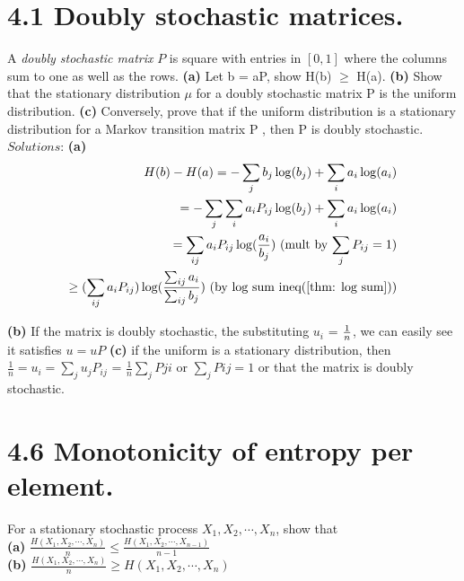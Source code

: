 \documentclass[10pt]{article}
\newcommand{\pref}[1]{{(\ref{#1})}}
\begin{document}
\begin{tiny}
\begin{multicols}{3}
\section*{4.1 Doubly stochastic matrices.} %
A \emph{doubly stochastic matrix} $P$ is square with entries in $[0,1]$ where the columns sum to one as well as the rows. 
\textbf{(a)}  Let b = aP, show H(b) $\ge$ H(a). 
\textbf{(b)} Show that the stationary distribution $\mu$ for a doubly stochastic matrix P is the uniform distribution. 
\textbf{(c)} Conversely, prove that if the uniform distribution is a stationary distribution for a Markov transition matrix P , then P is doubly stochastic.
$Solutions$:
\textbf{(a)}
\begin{eqnarray*}
H(b) - H(a) 
= -\sum_j b_j \log (b_j) + \sum_i a_i \log (a_i) \\
= - \sum_j \sum_i a_iP_{ij} \log(b_j)+\sum_i a_i \log (a_i) \\
= \sum_{ij}a_iP_{ij} \log(\frac{ a_i }{ b_j }) 
\text{ (mult by $\sum_j P_{ij} = 1$)} \\
\ge (\sum_{ij}a_iP_{ij}) \log(\frac{\sum_{ij} a_i }{\sum_{ij} b_j })
\text{ (by log sum ineq\pref{thm: log sum})} \\
\end{eqnarray*}

\textbf{(b)} If the matrix is doubly stochastic, the substituting $u_i$ = $1\over{n}$, we can easily see it satisfies $u=uP$
\textbf{(c)} if the uniform is a stationary distribution, then
$\frac{1}{n} = u_i = \sum_{j}u_{j}P_{ij}$ = $ \frac{1}{n}\sum_jP{ji}$ or $\sum_jP{ij}=1$ or that the matrix is doubly stochastic.


\section*{4.6 Monotonicity of entropy per element.}
For a stationary stochastic process $X_1, X_2, \cdots , X_n$, show that
\\ \textbf{(a)} $\frac{H(X_1,X_2,\cdots,X_n)}{n} \le \frac{H(X_1,X_2,\cdots,X_{n - 1})}{ n - 1} $
\\ \textbf{(b)} $\frac{H(X_1,X_2,\cdots,X_n)}{n} \ge H(X_1,X_2,\cdots,X_n)$


\end{multicols}
\end{tiny}
\end{document}
